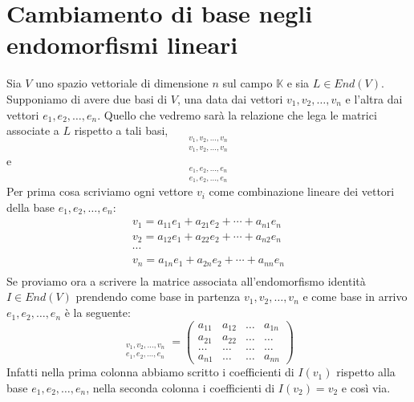 \section{Cambiamento di base negli endomorfismi lineari}
Sia $V$ uno spazio vettoriale di dimensione $n$ sul campo $\mathbb{K}$
e sia $L \in End(V)$. Supponiamo di avere due basi di $V$, una data dai vettori
$v_1, v_2, \dots, v_n$ e l'altra dai vettori $e_1, e_2, \dots, e_n$. Quello che
vedremo sar\`a la relazione che lega le matrici associate a $L$ rispetto a tali
basi,
\begin{equation*}
	[L]_{\substack{
			v_1, v_2, \dots, v_n \\
			v_1, v_2, \dots, v_n
		}}
\end{equation*}
e
\begin{equation*}
	[L]_{\substack{
			e_1, e_2, \dots, e_n \\
			e_1, e_2, \dots, e_n
		}}
\end{equation*}
Per prima cosa scriviamo ogni vettore $v_i$ come combinazione lineare dei vettori
della base $e_1, e_2, \dots, e_n$:
\begin{gather*}
	v_1 = a_{11}e_1 + a_{21}e_2 + \cdots + a_{n1}e_n \\
	v_2 = a_{12}e_1 + a_{22}e_2 + \cdots + a_{n2}e_n \\
	\cdots                                           \\
	v_n = a_{1n}e_1 + a_{2n}e_2 + \cdots + a_{nn}e_n \\
\end{gather*}
Se proviamo ora a scrivere la matrice associata all'endomorfismo identit\`a
$I \in End(V)$ prendendo come base in partenza $v_1, v_2, \dots, v_n$ e come base
in arrivo $e_1, e_2, \dots, e_n$ \`e la seguente:
\begin{equation*}
	[I]_{\substack{
			v_1, v_2, \dots, v_n \\
			e_1, e_2, \dots, e_n
		}} = \begin{pmatrix}
		a_{11} & a_{12} & \dots & a_{1n} \\
		a_{21} & a_{22} & \dots & \dots  \\
		\dots  & \dots  & \dots & \dots  \\
		a_{n1} & \dots  & \dots & a_{nn}
	\end{pmatrix}
\end{equation*}
Infatti nella prima colonna abbiamo scritto i coefficienti di $I(v_1)$ rispetto
alla base $e_1, e_2, \dots, e_n$, nella seconda colonna i coefficienti di
$I(v_2) = v_2$ e cos\`i via.

